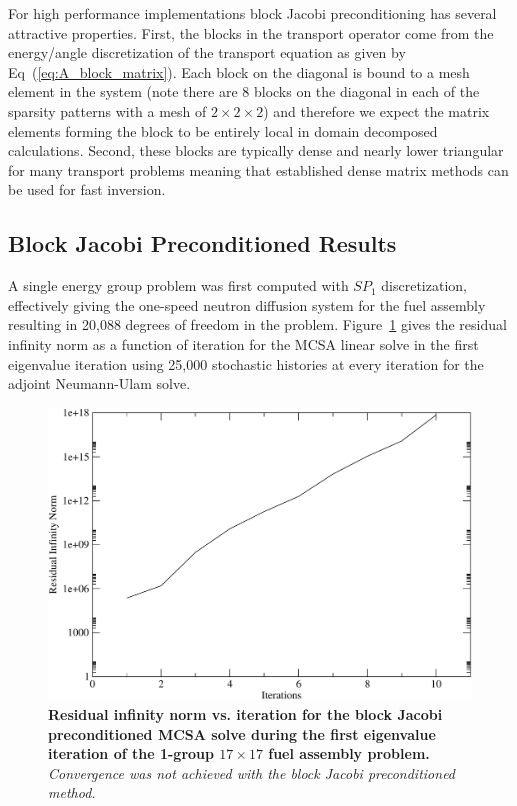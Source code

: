 For high performance implementations block Jacobi preconditioning has
several attractive properties. First, the blocks in the transport
operator come from the energy/angle discretization of the transport
equation as given by Eq~(\ref{eq:A_block_matrix}). Each block on the
diagonal is bound to a mesh element in the system (note there are 8
blocks on the diagonal in each of the sparsity patterns with a mesh of
$2 \times 2 \times 2$) and therefore we expect the matrix elements
forming the block to be entirely local in domain decomposed
calculations. Second, these blocks are typically dense and nearly
lower triangular for many transport problems meaning that established
dense matrix methods can be used for fast inversion.

\subsection{Block Jacobi Preconditioned Results}
\label{subsec:jacobi_prec_assembly_calc}
A single energy group problem was first computed with $SP_1$
discretization, effectively giving the one-speed neutron diffusion
system for the fuel assembly resulting in 20,088 degrees of freedom in
the problem. Figure~\ref{fig:block_jacobi_res_mcsa} gives the residual
infinity norm as a function of iteration for the MCSA linear solve in
the first eigenvalue iteration using 25,000 stochastic histories at
every iteration for the adjoint Neumann-Ulam solve.
\begin{figure}[t!]
  \begin{center}
    \includegraphics[width=5in]{chapters/spn_equations/block_jacobi_res.pdf}
  \end{center}
  \caption{\textbf{Residual infinity norm vs. iteration for the block
      Jacobi preconditioned MCSA solve during the first eigenvalue
      iteration of the 1-group $17 \times 17$ fuel assembly problem.}
    \textit{Convergence was not achieved with the block Jacobi
      preconditioned method.}}
  \label{fig:block_jacobi_res_mcsa}
\end{figure}
